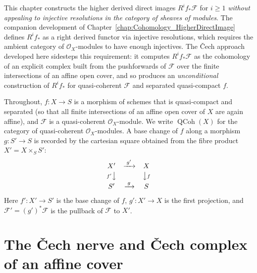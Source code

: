 This chapter constructs the higher derived direct images \(R^i f_*\mathcal{F}\) for
\(i \geq 1\) \emph{without appealing to injective resolutions in the category of
sheaves of modules}. The companion development of
Chapter~\ref{chap:Cohomology_HigherDirectImage} defines \(R^i f_*\) as a right
derived functor via injective resolutions, which requires the ambient category of
\(\mathcal{O}_X\)-modules to have enough injectives. The {\v C}ech approach
developed here sidesteps this requirement:
it computes \(R^i f_*\mathcal{F}\) as the cohomology of an explicit complex built
from the pushforwards of \(\mathcal{F}\) over the finite intersections of an affine
open cover, and so produces an \emph{unconditional} construction of \(R^i f_*\) for
quasi-coherent \(\mathcal{F}\) and separated quasi-compact \(f\).

Throughout, \(f : X \to S\) is a morphism of schemes that is quasi-compact and
separated (so that all finite intersections of an affine open cover of \(X\) are
again affine), and \(\mathcal{F}\) is a quasi-coherent \(\mathcal{O}_X\)-module. We
write \(\operatorname{QCoh}(X)\) for the category of quasi-coherent
\(\mathcal{O}_X\)-modules. A base change of \(f\) along a morphism \(g : S' \to S\)
is recorded by the cartesian square obtained from the fibre product
\(X' = X \times_S S'\):
\[
  \begin{array}{ccc}
    X' & \xrightarrow{\;g'\;} & X \\[2pt]
    {\scriptstyle f'}\big\downarrow & & \big\downarrow{\scriptstyle f} \\[2pt]
    S' & \xrightarrow{\;g\;} & S
  \end{array}
\]
Here \(f' : X' \to S'\) is the base change of \(f\), \(g' : X' \to X\) is the first
projection, and \(\mathcal{F}' = (g')^*\mathcal{F}\) is the pullback of
\(\mathcal{F}\) to \(X'\).

\section{The {\v C}ech nerve and {\v C}ech complex of an affine cover}

